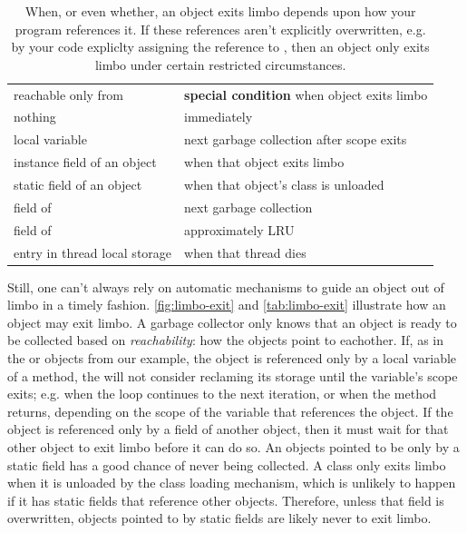 \begin{table}
\centering
	\begin{tabular}{ll} \toprule reachable only from  & \textbf{special condition}
	when object exits limbo \\ \cmidrule(r){1-1} \cmidrule(l){2-2}
			nothing & immediately
        	\\
        	local variable & next garbage collection after scope exits
        	\\ \addlinespace
        	instance field of an object & 
        	when that object exits limbo %
        	\\
        	static field of an object &
        	when that object's class is unloaded
        	\\ \addlinespace
        	field of \class{WeakReference} & next garbage
        	collection
        	\\
        	field of \class{SoftReference} & approximately
        	LRU%
        	\\
        	entry in thread local storage & when that thread dies
        	\\ 
        \bottomrule
    \end{tabular}
	\caption{When, or
	even whether, an object exits limbo depends upon how your program references
	it. If these references aren't explicitly overwritten, e.g. by your
	code expliclty assigning the reference to , then an object only
	exits limbo under certain restricted circumstances.
	}
	\label{tab:limbo-exit}
\end{table}

Still, one can't always rely on automatic mechanisms to guide an object out of
limbo in a timely fashion.
\autoref{fig:limbo-exit} and \autoref{tab:limbo-exit}
illustrate how an object may exit limbo. 
A garbage collector only knows that an object is ready to
be collected based on {\em reachability}: how the objects point to eachother.
If, as in the 
or  objects from our example, the object is referenced
only by a local variable of a method, the \jre will not consider reclaming its
storage until the variable's scope exits; e.g. when the loop continues to the
next iteration, or when the method returns, depending on the scope of the
variable that references the object. If the object is referenced only by a
field of another object, then it must wait for that other object to exit limbo
before it can do so. 
An objects pointed to be only by a static field has a good chance of never
being collected. A class only exits limbo when it is unloaded by the \jres
class loading mechanism, which is unlikely to happen if it has static fields
that reference other objects. Therefore, unless that field is overwritten,
objects pointed to by static fields are likely never to exit limbo.

